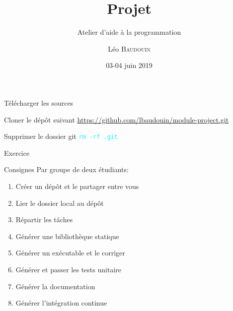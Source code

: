 \documentclass{beamer}
\title{Projet}
\subtitle{Atelier d'aide à la programmation}
\author{L\'eo \textsc{Baudouin}}
\institute{
  {\url{baudouin.leo @ gmail.com}}
}
\date{03-04 juin 2019}
\begin{document}
\begin{frame}
  \titlepage
\end{frame}


\section{}
\subsection{}

\begin{frame}[fragile]{Télécharger les sources}
  \begin{block}{Cloner le dép\^ot suivant}
    \url{https://github.com/lbaudouin/module-project.git}
  \end{block}
    \begin{block}{Supprimer le dossier git}
\textcolor{cyan}{\verb?rm -rf .git?} 
  \end{block}
\end{frame}

\begin{frame}{Exercice}  
    \begin{exampleblock}{Consignes}
	Par groupe de deux étudiants:
    \begin{enumerate}
    \item Créer un dépôt et le partager entre vous
    \item Lier le dossier local au dépôt
    \item Répartir les tâches
    \item Générer une bibliothèque statique
    \item Générer un exécutable et le corriger
    \item Générer et passer les tests unitaire
    \item Générer la documentation
    \item Générer l'intégration continue
    \end{enumerate}
  \end{exampleblock}
\end{frame}

\end{document}
